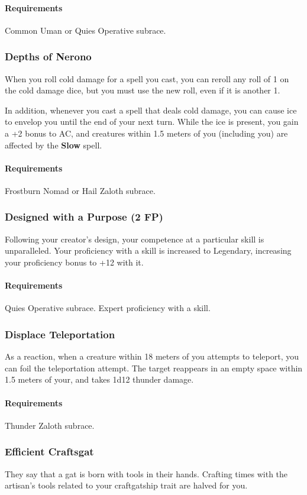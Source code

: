     \paragraph{Requirements} Common Uman or Quies Operative subrace.
\subsubsection{Depths of Nerono} \label{feat::depthsofnerono}
    When you roll cold damage for a spell you cast, you can reroll any roll of 1 on the cold damage dice, but you must use the new roll, even if it is another 1.

    In addition, whenever you cast a spell that deals cold damage, you can cause ice to envelop you until the end of your next turn.
    While the ice is present, you gain a +2 bonus to AC, and creatures within 1.5 meters of you (including you) are affected by the \textbf{Slow} spell.
    \paragraph{Requirements} Frostburn Nomad or Hail Zaloth subrace.
\subsubsection{Designed with a Purpose (2 FP)} \label{feat::designedwithapurpose}
    Following your creator's design, your competence at a particular skill is unparalleled.
    Your proficiency with a skill is increased to Legendary, increasing your proficiency bonus to +12 with it.
    \paragraph{Requirements} Quies Operative subrace. Expert proficiency with a skill.
\subsubsection{Displace Teleportation} \label{feat::displaceteleportation}
    As a reaction, when a creature within 18 meters of you attempts to teleport, you can foil the teleportation attempt.
    The target reappears in an empty space within 1.5 meters of your, and takes 1d12 thunder damage.
    \paragraph{Requirements} Thunder Zaloth subrace.
\subsubsection{Efficient Craftsgat} \label{feat::efficientcraftsgat}
    They say that a gat is born with tools in their hands.
    Crafting times with the artisan's tools related to your craftgatship trait are halved for you.
